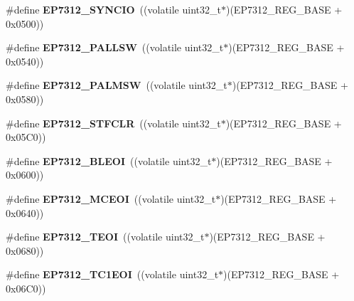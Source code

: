\begin{DoxyCompactItemize}
\#define {\bfseries E\+P7312\+\_\+\+S\+Y\+N\+C\+IO}~((volatile uint32\+\_\+t$\ast$)(E\+P7312\+\_\+\+R\+E\+G\+\_\+\+B\+A\+SE + 0x0500))
\item 
\mbox{\label{group__edb7312__registers_ga2aadbe02268c92a277b9db28df7a6794}} 
\#define {\bfseries E\+P7312\+\_\+\+P\+A\+L\+L\+SW}~((volatile uint32\+\_\+t$\ast$)(E\+P7312\+\_\+\+R\+E\+G\+\_\+\+B\+A\+SE + 0x0540))
\item 
\mbox{\label{group__edb7312__registers_gabf0ab47b5a03f0168f34384e60f65b0c}} 
\#define {\bfseries E\+P7312\+\_\+\+P\+A\+L\+M\+SW}~((volatile uint32\+\_\+t$\ast$)(E\+P7312\+\_\+\+R\+E\+G\+\_\+\+B\+A\+SE + 0x0580))
\item 
\mbox{\label{group__edb7312__registers_ga1f30fd10a515c50af5f0755aeb707e23}} 
\#define {\bfseries E\+P7312\+\_\+\+S\+T\+F\+C\+LR}~((volatile uint32\+\_\+t$\ast$)(E\+P7312\+\_\+\+R\+E\+G\+\_\+\+B\+A\+SE + 0x05\+C0))
\item 
\mbox{\label{group__edb7312__registers_ga5c028cfcfd7ca3f4d11945ce26873f80}} 
\#define {\bfseries E\+P7312\+\_\+\+B\+L\+E\+OI}~((volatile uint32\+\_\+t$\ast$)(E\+P7312\+\_\+\+R\+E\+G\+\_\+\+B\+A\+SE + 0x0600))
\item 
\mbox{\label{group__edb7312__registers_ga152f09dc3ff74da6477807dd30296df5}} 
\#define {\bfseries E\+P7312\+\_\+\+M\+C\+E\+OI}~((volatile uint32\+\_\+t$\ast$)(E\+P7312\+\_\+\+R\+E\+G\+\_\+\+B\+A\+SE + 0x0640))
\item 
\mbox{\label{group__edb7312__registers_ga01de0800dc552121c5d5567303c023b6}} 
\#define {\bfseries E\+P7312\+\_\+\+T\+E\+OI}~((volatile uint32\+\_\+t$\ast$)(E\+P7312\+\_\+\+R\+E\+G\+\_\+\+B\+A\+SE + 0x0680))
\item 
\mbox{\label{group__edb7312__registers_ga0b9a5a830746d1ae29a067c70c928741}} 
\#define {\bfseries E\+P7312\+\_\+\+T\+C1\+E\+OI}~((volatile uint32\+\_\+t$\ast$)(E\+P7312\+\_\+\+R\+E\+G\+\_\+\+B\+A\+SE + 0x06\+C0))
\item 
\mbox{\label{group__edb7312__registers_ga6efdad6413d188a66a13b8ae86138563}} 

\end{DoxyCompactItemize}
